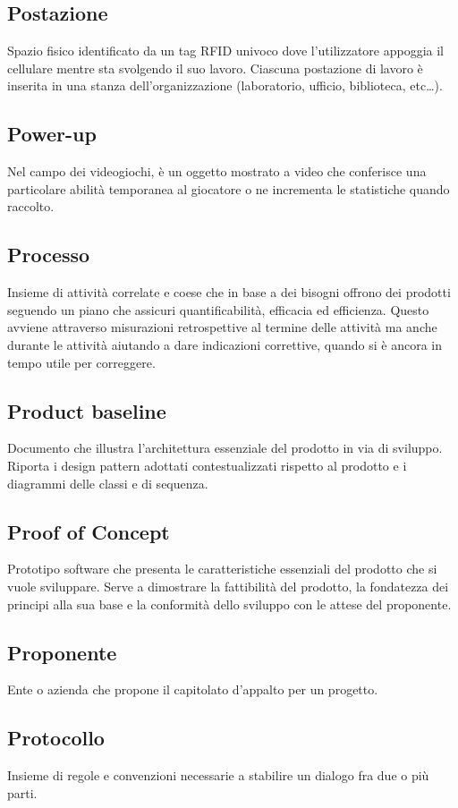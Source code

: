 \subsection{Postazione} Spazio fisico identificato da un tag RFID univoco dove l’utilizzatore appoggia il cellulare mentre sta svolgendo il suo lavoro. Ciascuna postazione di lavoro è inserita in una stanza
dell'organizzazione (laboratorio, ufficio, biblioteca, etc\dots).
\subsection{Power-up} Nel campo dei videogiochi, è un oggetto mostrato a video che conferisce una particolare abilità temporanea al giocatore o ne incrementa le statistiche quando raccolto.
\subsection{Processo} Insieme di attività correlate e coese che in base a dei bisogni offrono dei prodotti seguendo un piano che assicuri quantificabilità, efficacia ed efficienza. Questo avviene attraverso misurazioni retrospettive al termine delle attività ma anche durante le attività aiutando a dare indicazioni correttive, quando si è ancora in tempo utile per correggere.
\subsection{Product baseline} Documento che illustra l'architettura essenziale del prodotto in via di sviluppo. \\
Riporta i design pattern adottati contestualizzati rispetto al prodotto e i diagrammi delle classi e di sequenza.
\subsection{Proof of Concept} Prototipo software che presenta le caratteristiche essenziali del prodotto che si vuole sviluppare. Serve a dimostrare la fattibilità del prodotto, la fondatezza dei principi alla sua base e la conformità dello sviluppo con le attese del proponente.
\subsection{Proponente} Ente o azienda che propone il capitolato d’appalto per un progetto.
\subsection{Protocollo} Insieme di regole e convenzioni necessarie a stabilire un dialogo fra due o più parti.
